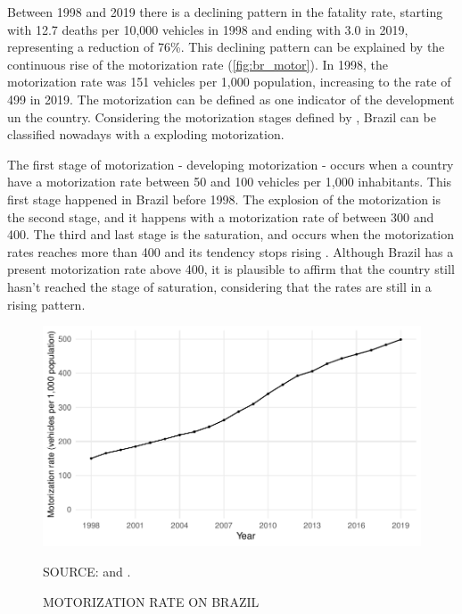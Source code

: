 Between 1998 and 2019 there is a declining pattern in the fatality rate, starting with 12.7 deaths per 10,000 vehicles in 1998 and ending with 3.0 in 2019, representing a reduction of 76\%. This declining pattern can be explained by the continuous rise of the motorization rate (\autoref{fig:br_motor}). In 1998, the motorization rate was 151 vehicles per 1,000 population, increasing to the rate of 499 in 2019. The motorization can be defined as one indicator of the development un the country. Considering the motorization stages defined by \textcite{Jørgensen2005}, Brazil can be classified nowadays with a exploding motorization. 

The first stage of motorization - developing motorization - occurs when a country have a motorization rate between 50 and 100 vehicles per 1,000 inhabitants. This first stage happened in Brazil before 1998. The explosion of the motorization is the second stage, and it happens with a motorization rate of between 300 and 400. The third and last stage is the saturation, and occurs when the motorization rates reaches more than 400 and its tendency stops rising \cite{Jørgensen2005}. Although Brazil has a present motorization rate above 400, it is plausible to affirm that the country still hasn't reached the stage of saturation, considering that the rates are still in a rising pattern. 


\begin{figure}[!htbp]
    \centering\footnotesize
    \captionsetup{font=footnotesize}
    \caption{MOTORIZATION RATE ON BRAZIL}
    \includegraphics{fig/brazil_motor.pdf}
    \label{fig:br_motor}
    \par SOURCE: \textcite{MinistryofHealth2020} and \textcite{DENATRAN2020}.
\end{figure} 

